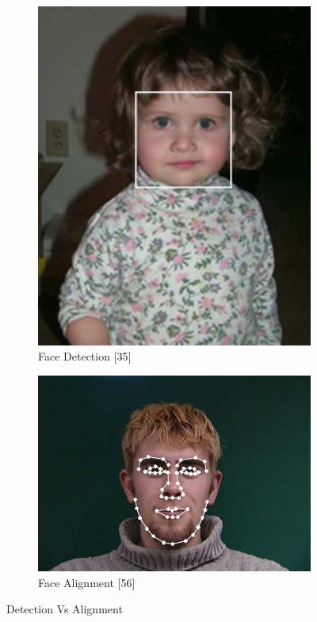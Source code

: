 \documentclass[12pt, twoside]{report}
\begin{document}
	\begin{figure}%
		\begin{subfigure}{0.5\textwidth}
		\centering
		\includegraphics[width=.6\linewidth, height=0.8\linewidth]{img/17_1.png}
		\caption[label a]{Face Detection [35]}
		\label{fig:test1}
		\end{subfigure}%
		\begin{subfigure}{0.5\textwidth}
		\centering
		\includegraphics[width=\linewidth, height=0.8\linewidth]{img/17_2.png}
		\caption[label b]{Face Alignment [56]}
		\label{fig:test2}
		\end{subfigure}
		\caption{Detection Vs Alignment}
	\end{figure}
		
\end{document}

